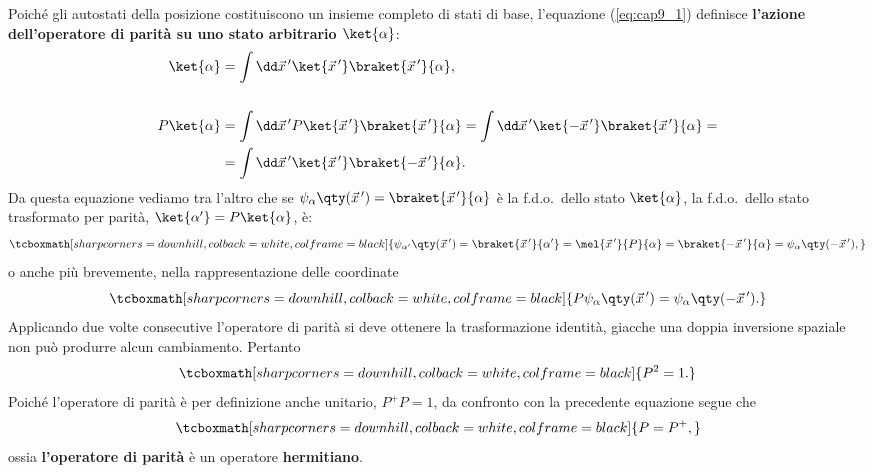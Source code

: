 Poiché gli autostati della posizione costituiscono un insieme completo di stati di base, l'equazione (\ref{eq:cap9_1}) definisce \textbf{l'azione dell'operatore di parità su uno stato arbitrario $\ket{\alpha}$}:
	\begin{align}
	  \ket{\alpha} &= \int\dd \vec{x}^{\, \prime} \ket{\vec{x}^{\, \prime}}\braket{\vec{x}^{\, \prime}}{\alpha},\\
	  \nonumber \\
	  P\ket{\alpha} &= \int\dd \vec{x}^{\, \prime} P\ket{ \vec{x}^{\, \prime}}\braket{\vec{x}^{\, \prime}}{\alpha} = \int\dd \vec{x}^{\, \prime} \ket{-\vec{x}^{\, \prime}}\braket{\vec{x}^{\, \prime}}{\alpha} =\nonumber\\
	  &= \int\dd \vec{x}^{\, \prime} \ket{\vec{x}^{\, \prime}}\braket{-\vec{x}^{\, \prime}}{\alpha} .
	\end{align}
Da questa equazione vediamo tra l'altro che se $\psi_{\alpha}\qty(\vec{x}^{\, \prime}) = \braket{\vec{x}^{\, \prime}}{\alpha}$ è la f.d.o.~dello stato $\ket{\alpha}$, la f.d.o.~dello stato trasformato per parità, $\ket{\alpha'} = P\ket{\alpha}$, è:
	\begin{equation}
	  \tcboxmath[sharp corners=downhill, colback=white, colframe=black]{
		  \psi_{\alpha'}\qty(\vec{x}^{\, \prime}) = \braket{\vec{x}^{\, \prime}}{\alpha'} = \mel{\vec{x}^{\, \prime}}{P}{\alpha} = \braket{-\vec{x}^{\, \prime}}{\alpha} = \psi_{\alpha}\qty(-\vec{x}^{\, \prime})  ,
		  }
	\end{equation}
o anche più brevemente, nella rappresentazione delle coordinate
	\begin{equation}
	  \tcboxmath[sharp corners=downhill, colback=white, colframe=black]{
	  P\psi_{\alpha}\qty(\vec{x}^{\, \prime}) = \psi_{\alpha}\qty(-\vec{x}^{\, \prime}) .
	  }
	\end{equation}
Applicando due volte consecutive l'operatore di parità si deve ottenere la trasformazione identità, giacche una doppia inversione spaziale non può produrre alcun cambiamento. Pertanto
	\begin{equation}
	  \label{eq:cap9_2}
	 \tcboxmath[sharp corners=downhill, colback=white, colframe=black]{
		  P^2 = 1 .
		  }
	\end{equation}
Poiché l'operatore di parità è per definizione anche unitario, $P^{+}P=1$, da confronto con la precedente equazione segue che
	\begin{equation}
		\tcboxmath[sharp corners=downhill, colback=white, colframe=black]{
			P= P^{+} ,
			}
	\end{equation}
ossia \textbf{l'operatore di parità} è un operatore \textbf{hermitiano}.\\

